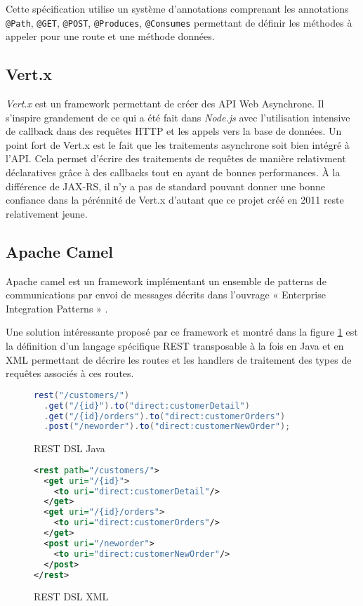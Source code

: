 \documentclass[a4paper, 11pt]{report}
\begin{document}
Cette spécification utilise un système d'annotations comprenant les
annotations \verb=@Path=, \verb=@GET=, \verb=@POST=, \verb=@Produces=,
\verb=@Consumes= permettant de définir les méthodes à appeler pour une
route et une méthode données.

\subsection{Vert.x}

\emph{Vert.x} est un framework permettant de créer des API Web
Asynchrone.  Il s'inspire grandement de ce qui a été fait dans
\emph{Node.js} avec l'utilisation intensive de callback dans des
requêtes HTTP et les appels vers la base de données. Un point fort de
Vert.x est le fait que les traitements asynchrone soit bien intégré à
l'API. Cela permet d'écrire des traitements de requêtes de manière
relativment déclaratives grâce à des callbacks tout en ayant de bonnes
performances.  À la différence de JAX-RS, il n'y a pas de standard
pouvant donner une bonne confiance dans la pérénnité de Vert.x
d'autant que ce projet créé en 2011 reste relativement jeune.

\subsection{Apache Camel}

Apache camel est un framework implémentant un ensemble de patterns de
communications par envoi de messages décrits dans l'ouvrage «
Enterprise Integration Patterns » \cite{hohpe2003enterprise}.

Une solution intéressante proposé par ce framework et montré dans la
figure \ref{fig:restdsl} est la définition d'un langage spécifique REST
transposable à la fois en Java et en XML permettant de décrire les
routes et les handlers de traitement des types de requêtes associés à
ces routes.

\begin{figure}
  \ContinuedFloat*
  \begin{lstlisting}[language=java]
rest("/customers/")
  .get("/{id}").to("direct:customerDetail")
  .get("/{id}/orders").to("direct:customerOrders")
  .post("/neworder").to("direct:customerNewOrder");
  \end{lstlisting}
  \caption{REST DSL Java}
\end{figure}

\begin{figure}
  \ContinuedFloat
  \begin{lstlisting}[language=xml]
<rest path="/customers/">
  <get uri="/{id}">
    <to uri="direct:customerDetail"/>
  </get>
  <get uri="/{id}/orders">
    <to uri="direct:customerOrders"/>
  </get>
  <post uri="/neworder">
    <to uri="direct:customerNewOrder"/>
  </post>
</rest>
  \end{lstlisting}
  \caption{REST DSL XML}
  \label{fig:restdsl}
\end{figure}
\end{document}

